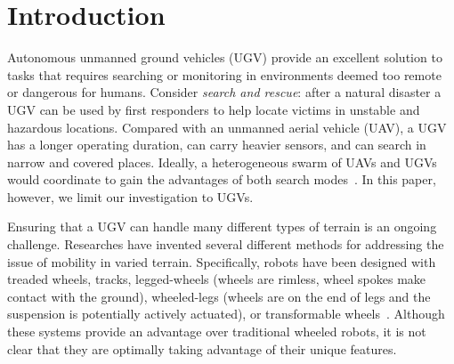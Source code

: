 

\section{Introduction}


Autonomous unmanned ground vehicles (UGV) provide an excellent solution to tasks that requires searching or monitoring in environments deemed too remote or dangerous for humans.
%
Consider \emph{search and rescue}: after a natural disaster a UGV can be used by first responders to help locate victims in unstable and hazardous locations.
%
Compared with an unmanned aerial vehicle (UAV), a UGV has a longer operating duration, can carry heavier sensors, and can search in narrow and covered places.
%
Ideally, a heterogeneous swarm of UAVs and UGVs would coordinate to gain the advantages of both search modes~\autocite{Kruijff.SearchAndRescue.ICFSR.2014}.
%
In this paper, however, we limit our investigation to UGVs.


Ensuring that a UGV can handle many different types of terrain is an ongoing challenge.
%
Researches have invented several different methods for addressing the issue of mobility in varied terrain.
%
Specifically, robots have been designed with treaded wheels, tracks, legged-wheels (wheels are rimless, wheel spokes make contact with the ground), wheeled-legs (wheels are on the end of legs and the suspension is potentially actively actuated), or transformable wheels~\autocite{Saranli.IntJrnRoboRes.RHex.2001,Quinn.IROS.Whegs.2002,Eich.SSRR.Stair-climb-SAR.2008,Haldane.ICRA.VelociRoACH.2013,Kenneally.IEEERobAutLetters.Legged-robots.2016}.
%
Although these systems provide an advantage over traditional wheeled robots, it is not clear that they are optimally taking advantage of their unique features.



